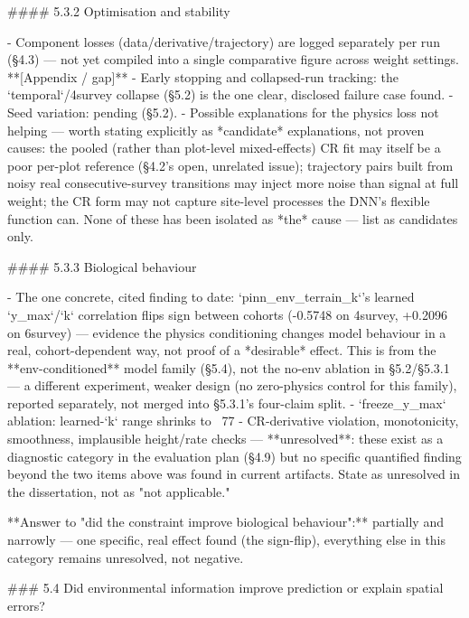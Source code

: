 #### 5.3.2 Optimisation and stability

- Component losses (data/derivative/trajectory) are logged separately per run (§4.3) — not yet compiled into a single comparative figure across weight settings. **[Appendix / gap]**
- Early stopping and collapsed-run tracking: the `temporal`/4survey collapse (§5.2) is the one clear, disclosed failure case found.
- Seed variation: pending (§5.2).
- Possible explanations for the physics loss not helping — worth stating explicitly as *candidate* explanations, not proven causes: the pooled (rather than plot-level mixed-effects) CR fit may itself be a poor per-plot reference (§4.2's open, unrelated issue); trajectory pairs built from noisy real consecutive-survey transitions may inject more noise than signal at full weight; the CR form may not capture site-level processes the DNN's flexible function can. None of these has been isolated as *the* cause — list as candidates only.

#### 5.3.3 Biological behaviour

- The one concrete, cited finding to date: `pinn_env_terrain_k`'s learned `y_max`/`k` correlation flips sign between cohorts (-0.5748 on 4survey, +0.2096 on 6survey) — evidence the physics conditioning changes model behaviour in a real, cohort-dependent way, not proof of a *desirable* effect. This is from the **env-conditioned** model family (§5.4), not the no-env ablation in §5.2/§5.3.1 — a different experiment, weaker design (no zero-physics control for this family), reported separately, not merged into §5.3.1's four-claim split.
- `freeze_y_max` ablation: learned-`k` range shrinks to ~77%
- CR-derivative violation, monotonicity, smoothness, implausible height/rate checks — **unresolved**: these exist as a diagnostic category in the evaluation plan (§4.9) but no specific quantified finding beyond the two items above was found in current artifacts. State as unresolved in the dissertation, not as "not applicable."

**Answer to "did the constraint improve biological behaviour":** partially and narrowly — one specific, real effect found (the sign-flip), everything else in this category remains unresolved, not negative.

### 5.4 Did environmental information improve prediction or explain spatial errors?

